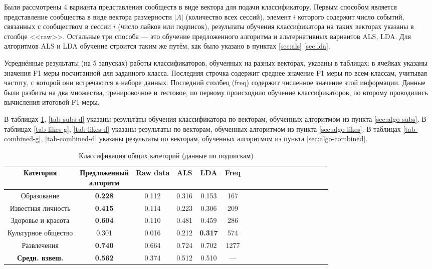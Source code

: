 \documentclass[times,specification,annotation]{itmo-student-thesis}
\begin{document}
Были рассмотрены 4 варианта представления сообществ в виде вектора для подачи классификатору. Первым способом является представление сообщества в виде вектора размерности $|A|$ (количество всех сессий), элемент $i$ которого содержит число событий, связанных с сообществом в сессии $i$ (число лайков или подписок), результаты обучения классификатора на таких векторах указаны в столбце <<raw>>. Остальные три способа --- это обучение предложенного алгоритма и альтернативных вариантов ALS, LDA. Для алгоритмов ALS и LDA обучение строится таким же путём, как было указано в пунктах \ref{sec:als} \ref{sec:lda}.  

Усреднённые результаты (на 5 запусках) работы классификаторов, обученных на разных векторах, указаны в таблицах: в ячейках указаны значения F1 меры посчитанной для заданного класса. Последняя строчка содержит среднее значение F1 меры по всем классам, учитывая частоту, с которой они встречаются в наборе данных. Последний столбец (freq) содержит численное значение этой информации. Данные были разбиты на два множества, тренировочное и тестовое, по первому происходило обучение классификаторов, по второму проводились вычисления итоговой F1 меры.

В таблицах \ref{tab-subs-g}, \ref{tab-subs-d} указаны результаты обучения классификатора по векторам, обученных алгоритмом из пункта \ref{sec:algo-subs}. В таблицах \ref{tab-likes-g}, \ref{tab-likes-d} указаны результаты по векторам, обученных алгоритмом из пункта \ref{sec:algo-likes}. В таблицах \ref{tab-combined-g}, \ref{tab-combined-d} указаны результаты по векторам, обученных алгоритмом из пункта \ref{sec:algo-combined}. 

\begin{table}[!h]
\caption{Классификация общих категорий (данные по подпискам)}\label{tab-subs-g}
\centering
\begin{tabular}{|*{18}{c|}}\hline
    Категория & \thead{Предложенный \\ алгоритм}  & Raw data & ALS & LDA & Freq \\\hline
Образование     & \textbf{0.228} & 0.112 & 0.316 & 0.153 & 167 \\\hline
Известная личность             & \textbf{0.415} & 0.114 & 0.223 & 0.306 & 209 \\\hline
Здоровье и красота             & \textbf{0.604} & 0.110 & 0.481 & 0.459 & 286 \\\hline
Культурное общество         & 0.301 & 0.016 & 0.212 & \textbf{0.317} & 574  \\\hline
Развлечения                           & \textbf{0.740} & 0.664 & 0.724 & 0.702 & 1277 \\\hline
\textbf{Средн. взвеш.}      & \textbf{0.562} & 0.374 & 0.512 & 0.510 & --- \\\hline
\end{tabular}
\end{table}
\end{document}
